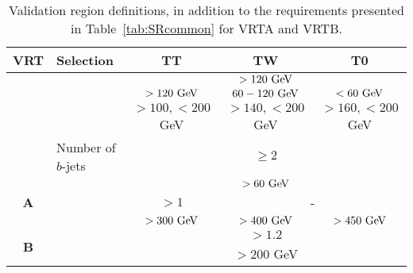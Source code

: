 	\begin{table}[htb]
	  \caption{Validation region definitions, in addition to the requirements presented in Table~\ref{tab:SRcommon} for VRTA and VRTB.}
	  \begin{center}
	    \def\arraystretch{1.4}%
	    \begin{tabular}{clccc} \toprule
	      {\textbf{VRT}}             & \textbf{Selection} & {\textbf{TT}}     & {\textbf{TW}}     & {\textbf{T0}}     \\ \toprule
	                                 & \mantikttwelvezero & \multicolumn{3}{c}{$>120\gev$}             \\ %
	                                 & \mantikttwelveone  & $>120\gev$   & $60-120\gev$ & $<60\gev$    \\ %
	                                 & \mtbmin            & $>100,<200$ GeV & $>140,<200$ GeV & $>160,<200$ GeV       \\ %
	                                 & Number of $b$-jets & \multicolumn{3}{c}{ $\geq 2$  }            \\ %
	      \midrule
	      \multirow{3}{*}{{\textbf{A}}}   & \mantikteightzero  & \multicolumn{3}{c}{$>60\gev$}              \\ %
	      & \drbjetbjet        & $>1$         & \multicolumn{2}{c}{-}       \\ %
	                                 & \met               & $> 300 \gev$ & $> 400 \gev$ & $> 450 \gev$ \\ \midrule
	      \multirow{2}{*}{{\textbf{B}}}   & \drbjetbjet           & \multicolumn{3}{c}{$>1.2$}             \\ %
	       & \mtbmax           & \multicolumn{3}{c}{$>200$ GeV}             \\ %
	      \toprule
	    \end{tabular}
	  \end{center}
	  \label{tab:VRTABDef}
	\end{table}%

